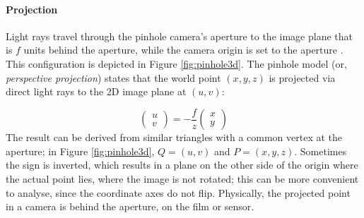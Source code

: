 \paragraph{Projection}
Light rays travel through the pinhole camera's aperture to the image plane that is $f$ units behind the aperture, while the camera origin is set to the aperture \cite{hartley03multiview}.
This configuration is depicted in Figure \ref{fig:pinhole3d}.
The pinhole model (or, \emph{perspective projection}) states that the world point $(x, y, z)$ is projected via direct light rays to the 2D image plane at $(u, v)$:

\begin{equation}
\begin{pmatrix}
u \\ v
\end{pmatrix}
=
-\frac{f}{z} \begin{pmatrix}
x \\ y
\end{pmatrix}
\end{equation}
The result can be derived from similar triangles with a common vertex at the aperture; in Figure \ref{fig:pinhole3d}, $Q = (u, v)$ and $P = (x, y, z)$.
Sometimes the sign is inverted, which results in a plane on the other side of the origin where the actual point lies, where the image is not rotated; this can be more convenient to analyse, since the coordinate axes do not flip.
Physically, the projected point in a camera is behind the aperture, on the film or sensor.

%

